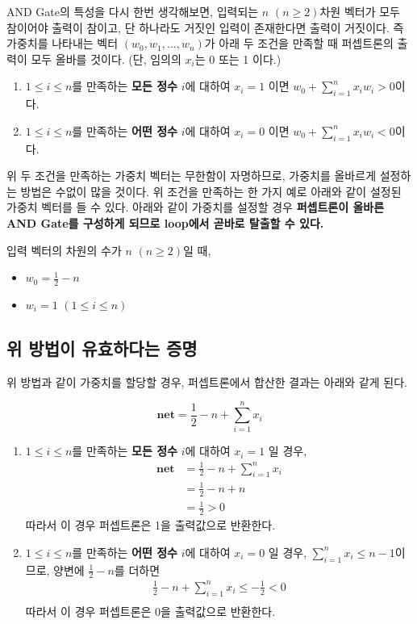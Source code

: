 \documentclass[letterpaper,10pt]{article}
\begin{document}
AND Gate의 특성을 다시 한번 생각해보면, 입력되는 $n$ $(n\geq 2)$차원 벡터가 모두 참이어야 출력이 참이고, 단 하나라도 거짓인 입력이 존재한다면 출력이 거짓이다. 즉 가중치를 나타내는 벡터 $(w_0, w_1, \dots, w_n)$가 아래 두 조건을 만족할 때 퍼셉트론의 출력이 모두 올바를 것이다. (단, 임의의 $x_i$는 0 또는 1 이다.)

\begin{enumerate}
    \item $1\leq i \leq n$를 만족하는 \textbf{모든 정수} $i$에 대하여 $x_i=1$ 이면 $w_0 + \sum_{i=1}^{n} x_i w_i > 0$이다.
    \item $1\leq i \leq n$를 만족하는 \textbf{어떤 정수} $i$에 대하여 $x_i=0$ 이면 $w_0 + \sum_{i=1}^{n} x_i w_i < 0$이다.
\end{enumerate}

위 두 조건을 만족하는 가중치 벡터는 무한함이 자명하므로, 가중치를 올바르게 설정하는 방법은 수없이 많을 것이다. 위 조건을 만족하는 한 가지 예로 아래와 같이 설정된 가중치 벡터를 들 수 있다. 아래와 같이 가중치를 설정할 경우 \textbf{퍼셉트론이 올바른 AND Gate를 구성하게 되므로 loop에서 곧바로 탈출할 수 있다.}

입력 벡터의 차원의 수가 $n$ $(n\geq 2)$일 때,
\begin{itemize}
    \item $w_0=\frac{1}{2}-n$
    \item $w_i=1$ $(1\leq i \leq n)$
\end{itemize}

\subsection{위 방법이 유효하다는 증명}

위 방법과 같이 가중치를 할당할 경우, 퍼셉트론에서 합산한 결과는 아래와 같게 된다.

\[
\textbf{net}=\frac{1}{2}-n+\sum_{i=1}^{n} x_i
\]

\begin{enumerate}
    \item $1\leq i \leq n$를 만족하는 \textbf{모든 정수} $i$에 대하여 $x_i=1$ 일 경우, \\
    \begin{align*}
        \textbf{net} &=\frac{1}{2}-n+\sum_{i=1}^{n} x_i \\
        &=\frac{1}{2}-n+n \\
        &=\frac{1}{2} > 0
    \end{align*}
    따라서 이 경우 퍼셉트론은 1을 출력값으로 반환한다.
    
    \item $1\leq i \leq n$를 만족하는 \textbf{어떤 정수} $i$에 대하여 $x_i=0$ 일 경우, $\sum_{i=1}^{n} x_i \leq n-1$이므로, 양변에 $\frac{1}{2}-n$를 더하면 \\
    \begin{align*}
        \frac{1}{2}-n+\sum_{i=1}^{n} x_i \leq -\frac{1}{2} < 0 \\
    \end{align*}
    따라서 이 경우 퍼셉트론은 0을 출력값으로 반환한다.
    
\end{enumerate}
\end{document}
